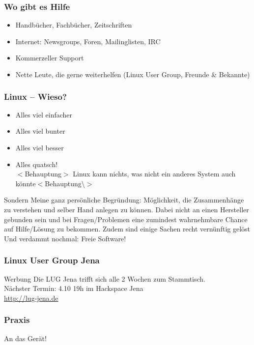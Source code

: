 \documentclass[compress]{beamer}
\begin{document}
\begin{frame}
	\frametitle{Wo gibt es Hilfe}
	\begin{block}{}
		\begin{itemize}
			\item Handbücher, Fachbücher, Zeitschriften
			\item Internet: Newsgroups, Foren, Mailinglisten, IRC
			\item Kommerzeller Support
			\item Nette Leute, die gerne weiterhelfen (Linux User Group, 
				Freunde \& Bekannte)
		\end{itemize}
	\end{block}
\end{frame}

\begin{frame}
	\frametitle{Linux -- Wieso?}
	\begin{block}{}
		\begin{itemize}
			\item Alles viel einfacher
			\pause{}
			\item Alles viel bunter
			\pause{}
			\item Alles viel besser
			\pause{}
			\item Alles quatsch! \\
				$<$Behauptung$>$ Linux kann nichts, was nicht ein anderes System auch könnte$<$Behauptung\textbackslash{}$>$
		\end{itemize}
	\end{block}
	\pause{}
	\begin{block}{Sondern}
		Meine ganz persönliche Begründung: Möglichkeit, die Zusammenhänge zu verstehen
		und selber Hand anlegen zu können. Dabei nicht an einen Hersteller 
		gebunden sein und bei Fragen/Problemen eine zumindest wahrnehmbare 
		Chance auf Hilfe/Lösung zu bekommen. Zudem sind einige Sachen recht vernünftig gelöst 
		\\Und verdammt nochmal: Freie Software!
	\end{block}
\end{frame}

\begin{frame}
	\frametitle{Linux User Group Jena}
	\begin{block}{Werbung}
		Die LUG Jena trifft sich alle 2 Wochen zum Stammtisch.\\
		Nächster Termin: 4.10 19h im Hackspace Jena \\
		\url{http://lug-jena.de}
	\end{block}
\end{frame}

\begin{frame}
	\frametitle{Praxis}
	\center{}	\Huge{An das Gerät!}
\end{frame}
\end{document}
